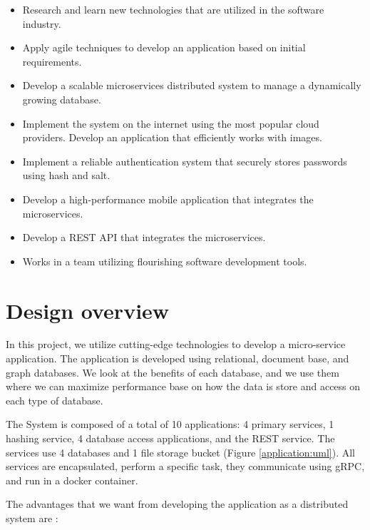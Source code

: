 \begin{itemize}
	\item Research and learn new technologies that are utilized in the software industry.
	
	\item Apply agile techniques to develop an application based on initial requirements.
	
   	\item 	Develop a scalable microservices distributed system to manage a dynamically growing database. 
	
	\item Implement the system on the internet using the most popular cloud providers.
	Develop an application that efficiently works with images.
	
	\item Implement a reliable authentication system that securely stores passwords using hash and salt.
	
	\item Develop a high-performance mobile application that integrates the microservices.
	
	\item Develop a REST API that integrates the microservices.
	
	\item Works in a team utilizing flourishing software development tools.
\end{itemize}


\section{Design overview}
\indent
\indent
In this project, we utilize cutting-edge technologies to develop a micro-service application.   The application is developed using relational, document base, and graph databases. We look at the benefits of each database, and we use them where we can maximize performance base on how the data is store and access on each type of database.

The System is composed of a total of 10 applications: 4 primary services, 1 hashing service, 4 database access applications, and the REST service. The services use  4 databases and 1 file storage bucket (Figure \ref{application:uml}). All services are encapsulated, perform a specific task, they communicate using gRPC, and run in a docker container.

The advantages that we want from developing the application as a distributed system are \cite{dsbook}:

